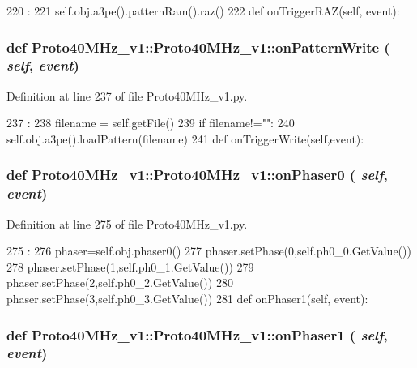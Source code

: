 \begin{DoxyCode}
220                                  :
221         self.obj.a3pe().patternRam().raz()
222 
    def onTriggerRAZ(self, event):
\end{DoxyCode}
\hypertarget{classProto40MHz__v1_1_1Proto40MHz__v1_a6ca90478be0b79fde68672e901c8c867}{
\subsubsection[{onPatternWrite}]{\setlength{\rightskip}{0pt plus 5cm}def Proto40MHz\_\-v1::Proto40MHz\_\-v1::onPatternWrite ( {\em self}, \/   {\em event})}}
\label{classProto40MHz__v1_1_1Proto40MHz__v1_a6ca90478be0b79fde68672e901c8c867}


Definition at line 237 of file Proto40MHz\_\-v1.py.


\begin{DoxyCode}
237                                   :
238         filename = self.getFile()
239         if filename!="":
240             self.obj.a3pe().loadPattern(filename)
241         
    def onTriggerWrite(self,event):
\end{DoxyCode}
\hypertarget{classProto40MHz__v1_1_1Proto40MHz__v1_a486e58a2a7bdebe49bafb73c79ed545b}{
\subsubsection[{onPhaser0}]{\setlength{\rightskip}{0pt plus 5cm}def Proto40MHz\_\-v1::Proto40MHz\_\-v1::onPhaser0 ( {\em self}, \/   {\em event})}}
\label{classProto40MHz__v1_1_1Proto40MHz__v1_a486e58a2a7bdebe49bafb73c79ed545b}


Definition at line 275 of file Proto40MHz\_\-v1.py.


\begin{DoxyCode}
275                               :
276         phaser=self.obj.phaser0()
277         phaser.setPhase(0,self.ph0_0.GetValue())
278         phaser.setPhase(1,self.ph0_1.GetValue())
279         phaser.setPhase(2,self.ph0_2.GetValue())
280         phaser.setPhase(3,self.ph0_3.GetValue())
281 
    def onPhaser1(self, event):
\end{DoxyCode}
\hypertarget{classProto40MHz__v1_1_1Proto40MHz__v1_abbc9f18e8ece8e3d652d8065f28ff258}{
\subsubsection[{onPhaser1}]{\setlength{\rightskip}{0pt plus 5cm}def Proto40MHz\_\-v1::Proto40MHz\_\-v1::onPhaser1 ( {\em self}, \/   {\em event})}}
\label{classProto40MHz__v1_1_1Proto40MHz__v1_abbc9f18e8ece8e3d652d8065f28ff258}


